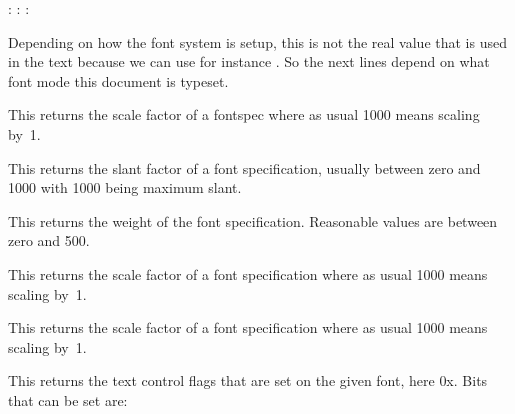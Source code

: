 \startbuffer
{\tf  \the\fontspecifiedsize\font : \the\glyphscale}
{\bfa \the\fontspecifiedsize\font : \the\glyphscale}
{\slx \the\fontspecifiedsize\font : \the\glyphscale}
\stopbuffer

\typebuffer

Depending on how the font system is setup, this is not the real value that is
used in the text because we can use for instance . So the next
lines depend on what font mode this document is typeset.

\startlines
\getbuffer
\stoplines

\stopnewprimitive

\startnewprimitive[title={\prm {fontspecscale}}]

This returns the scale factor of a fontspec where as usual 1000 means scaling
by~1.

\stopnewprimitive

\startnewprimitive[title={\prm {fontspecslant}}]

This returns the slant factor of a font specification, usually between zero and
1000 with 1000 being maximum slant.

\stopnewprimitive

\startnewprimitive[title={\prm {fontspecweight}}]

This returns the weight of the font specification. Reasonable values are between
zero and 500.

\stopnewprimitive

\startnewprimitive[title={\prm {fontspecxscale}}]

This returns the scale factor of a font specification where as usual 1000 means
scaling by~1.

\stopnewprimitive

\startnewprimitive[title={\prm {fontspecyscale}}]

This returns the scale factor of a font specification where as usual 1000 means
scaling by~1.

\stopnewprimitive

\startnewprimitive[title={\prm {fonttextcontrol}}]

This returns the text control flags that are set on the given font, here {\tttf
0x\tohexadecimal \fonttextcontrol \font}. Bits that can be set are:


\stopnewprimitive

\startnewprimitive[title={\prm {forcedleftcorrection}}]

